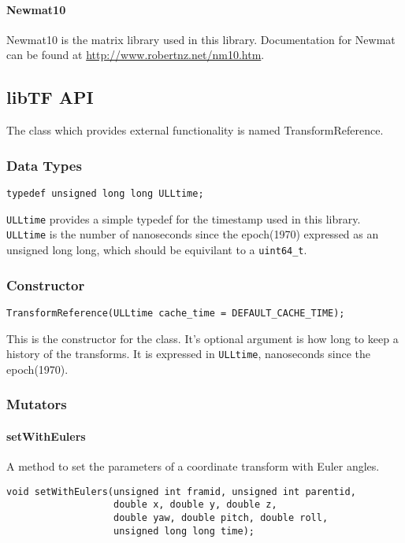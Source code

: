 \documentclass[12pt]{article}
\begin{document}
\paragraph {Newmat10}
Newmat10 is the matrix library used in this library.  Documentation for Newmat can be found at 
\url{http://www.robertnz.net/nm10.htm}.  

\subsection{libTF API}
The class which provides external functionality is named TransformReference.  

\subsubsection{Data Types}
\begin{verbatim}
typedef unsigned long long ULLtime;
\end{verbatim}

\texttt{ULLtime} provides a simple typedef for the timestamp used in this library. 
\texttt{ULLtime} is the number of nanoseconds since the epoch(1970) expressed as 
an unsigned long long, which should be equivilant to a \texttt{uint64\_t}. 

\subsubsection{Constructor}
\begin{verbatim}
TransformReference(ULLtime cache_time = DEFAULT_CACHE_TIME);
\end{verbatim}
This is the constructor for the class.  It's optional argument is 
how long to keep a history of the transforms.  It is expressed in 
\texttt{ULLtime}, nanoseconds since the epoch(1970).  

\subsubsection{Mutators}

\paragraph{setWithEulers}
A method to set the parameters of a coordinate transform with Euler angles. 
\begin{verbatim}
void setWithEulers(unsigned int framid, unsigned int parentid, 
                   double x, double y, double z, 
                   double yaw, double pitch, double roll, 
                   unsigned long long time);
\end{verbatim}
\end{document}
